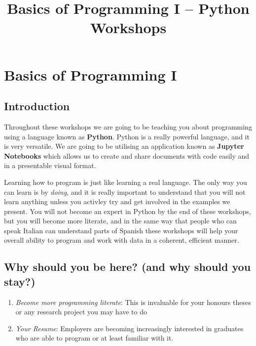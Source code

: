 \documentclass[11pt]{article}
\title{Basics of Programming I -- Python Workshops}
\providecommand{\tightlist}{%
      \setlength{\itemsep}{0pt}\setlength{\parskip}{0pt}}
\begin{document}
    
    
    \maketitle
    
    

    
    \hypertarget{basics-of-programming-i}{%
\section{Basics of Programming I}\label{basics-of-programming-i}}

    \hypertarget{introduction}{%
\subsection{Introduction}\label{introduction}}

    Throughout these workshops we are going to be teaching you about
programming using a language known as \textbf{Python}. Python is a
really powerful language, and it is very versatile. We are going to be
utilising an application known as \textbf{Jupyter Notebooks} which
allows us to create and share documents with code easily and in a
presentable visual format.

    Learning how to program is just like learning a real language. The only
way you can learn is by \emph{doing}, and it is really important to
understand that you will not learn anything unless you activley try and
get involved in the examples we present. You will not become an expert
in Python by the end of these workshops, but you will become more
literate, and in the same way that people who can speak Italian can
understand parts of Spanish these workshops will help your overall
ability to program and work with data in a coherent, efficient manner.

    \hypertarget{why-should-you-be-here-and-why-should-you-stay}{%
\subsection{Why should you be here? (and why should you
stay?)}\label{why-should-you-be-here-and-why-should-you-stay}}

    \begin{enumerate}
\def\labelenumi{\arabic{enumi}.}
\tightlist
\item
  \emph{Become more programming literate}: This is invaluable for your
  honours theses or any research project you may have to do
\item
  \emph{Your Resume}: Employers are becoming increasingly interested in
  graduates who are able to program or at least familiar with it.
\end{enumerate}
\end{document}
